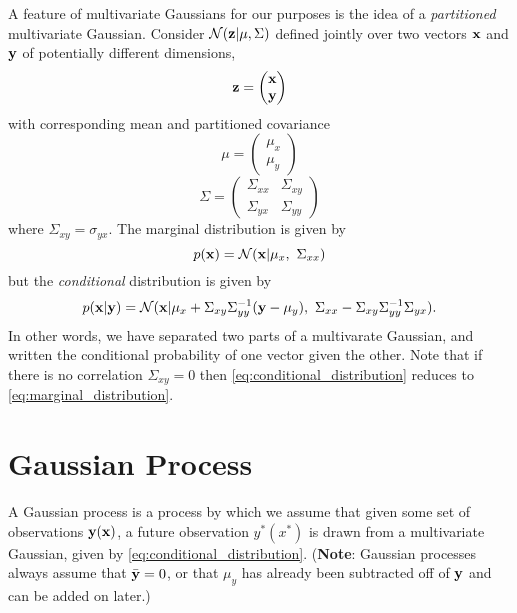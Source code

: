 \documentclass[11pt,twoside,a5paper]{article}
\newcommand{\bfx}{{\bf x}}
\newcommand{\bfy}{{\bf y}}
\newcommand{\bfz}{{\bf z}}
\newcommand{\norm}{{\cal N}}
\begin{document}
A feature of multivariate Gaussians for our purposes is the idea of a {\it partitioned} multivariate Gaussian. Consider $\norm(\bfz|\mu,\Sigma)$ defined jointly over two vectors $\bfx$ and $\bfy$ of potentially different dimensions,
\begin{equation}
  \label{eq:z}
  \bfz = \begin{pmatrix}
    \bfx\\ \bfy
    \end{pmatrix}
\end{equation}
with corresponding mean and partitioned covariance
\begin{equation}
  \label{eq:partitioned_mean}
  \mu = \begin{pmatrix}
    \mu_x\\ \mu_y
  \end{pmatrix}
\end{equation}
\begin{equation}
  \label{eq:partitioned_cov}
  \Sigma = \begin{pmatrix}
    \Sigma_{xx} & \Sigma_{xy} \\
    \Sigma_{yx} & \Sigma_{yy}
  \end{pmatrix}
\end{equation}
where $\Sigma_{xy}=\sigma_{yx}$. The marginal distribution is given by
\begin{equation}
  \label{eq:marginal_distribution}
  p(\bfx) = \norm(\bfx|\mu_x,\ \Sigma_{xx})
\end{equation}
but the {\it conditional} distribution is given by
\begin{equation}
  \label{eq:conditional_distribution}
  p(\bfx|\bfy) = \norm(\bfx|\mu_x+\Sigma_{xy}\Sigma_{yy}^{-1}(\bfy-\mu_y),\ 
  \Sigma_{xx} - \Sigma_{xy}\Sigma_{yy}^{-1}\Sigma_{yx}).
\end{equation}
In other words, we have separated two parts of a multivarate Gaussian, and written the conditional probability of one vector given the other. Note that if there is no correlation $\Sigma_{xy}=0$ then \ref{eq:conditional_distribution} reduces to \ref{eq:marginal_distribution}.

\section{Gaussian Process}

A Gaussian process is a process by which we assume that given some set of observations $\bfy(\bfx)$, a future observation $y^*(x^*)$ is drawn from a multivariate Gaussian, given by \ref{eq:conditional_distribution}. ({\bf Note}: Gaussian processes always assume that $\bar{\bfy}=0$, or that $\mu_y$ has already been subtracted off of $\bfy$ and can be added on later.)
\end{document}
